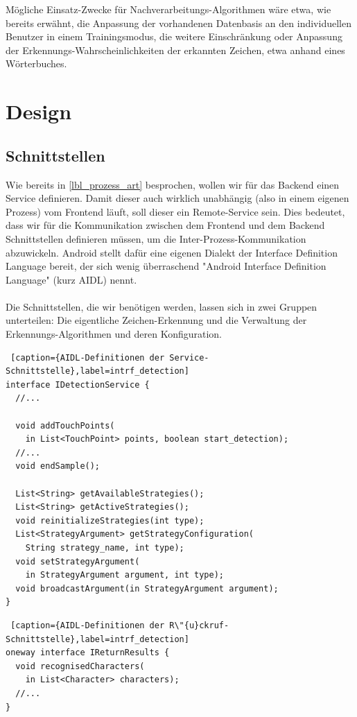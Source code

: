 Mögliche Einsatz-Zwecke für Nachverarbeitungs-Algorithmen wäre etwa, wie bereits erwähnt, die Anpassung der vorhandenen Datenbasis an den individuellen Benutzer in einem Trainingsmodus, die weitere Einschränkung oder Anpassung der Erkennungs-Wahrscheinlichkeiten der erkannten Zeichen, etwa anhand eines Wörterbuches.

\section{Design}

\subsection{Schnittstellen}

Wie bereits in \ref{lbl_prozess_art} besprochen, wollen wir für das Backend einen Service definieren. Damit dieser auch wirklich unabhängig (also in einem eigenen Prozess) vom Frontend läuft, soll dieser ein Remote-Service sein. Dies bedeutet, dass wir für die Kommunikation zwischen dem Frontend und dem Backend Schnittstellen definieren müssen, um die Inter-Prozess-Kommunikation abzuwickeln. Android stellt dafür eine eigenen Dialekt der Interface Definition Language bereit, der sich wenig überraschend "Android Interface Definition Language" (kurz AIDL) nennt.\\
\\
Die Schnittstellen, die wir benötigen werden, lassen sich in zwei Gruppen unterteilen: Die eigentliche Zeichen-Erkennung und die Verwaltung der Erkennungs-Algorithmen und deren Konfiguration.\\

\begin{lstlisting} [caption={AIDL-Definitionen der Service-Schnittstelle},label=intrf_detection]
interface IDetectionService {
  //...

  void addTouchPoints(
    in List<TouchPoint> points, boolean start_detection);
  //...
  void endSample();

  List<String> getAvailableStrategies();
  List<String> getActiveStrategies();
  void reinitializeStrategies(int type);
  List<StrategyArgument> getStrategyConfiguration(
    String strategy_name, int type);
  void setStrategyArgument(
    in StrategyArgument argument, int type);
  void broadcastArgument(in StrategyArgument argument);
}
\end{lstlisting}
\newpage
\begin{lstlisting} [caption={AIDL-Definitionen der R\"{u}ckruf-Schnittstelle},label=intrf_detection]
oneway interface IReturnResults {
  void recognisedCharacters(
    in List<Character> characters);
  //...
}
\end{lstlisting}

